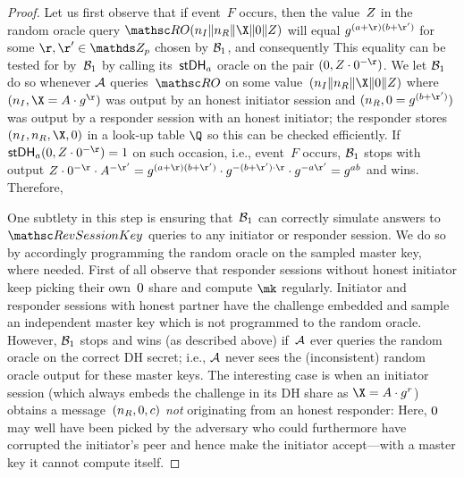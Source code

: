 \begin{proof}
Let us first observe that if event~$F$ occurs, then the value~$Z$ in the random oracle query $\RO(\nonce_I\|\nonce_R\|\X\|\Y\|\Zz)$ will equal $g^{(a+\r)(b+\r')}$ for some  $\r, \r' \in \ZZ_p$ chosen by $\mathcal{B}_1$, and consequently
This equality can be tested for by~$\mathcal{B}_1$ by calling its~$\mathsf{stDH}_a$ oracle on the pair $(\Y, \Zz \cdot \Y^{-\r})$.
We let $\mathcal{B}_1$ do so whenever $\mathcal{A}$ queries~$\RO$ on some value~$(\nonce_I\|\nonce_R\|\X\|\Y\|\Zz)$ where $(\nonce_I, \X = A \cdot g^\r)$ was output by an honest initiator session and $(\nonce_R, \Y = g^{(b+\r')})$ was output by a responder session with an honest initiator; the responder stores $(\nonce_I,\nonce_R,\X,\Y)$ in a look-up table $\Q$ so this can be checked efficiently.
If $\stDH_a(\Y, \Zz \cdot \Y^{-\r}) = 1$ on such occasion, i.e., event~$F$ occurs,
$\mathcal{B}_1$ stops with output $\Zz \cdot \Y^{-\r} \cdot A^{-\r'} = g^{(a+\r)(b+\r')} \cdot g^{-(b + \r') \cdot \r} \cdot g^{-a\r'} = g^{ab}$ and wins.
Therefore,

One subtlety in this step is ensuring that~$\mathcal{B}_1$ can correctly simulate answers to $\RevSessionKey$ queries to any initiator or responder session.
We do so by accordingly programming the random oracle on the sampled master key, where needed.
First of all observe that responder sessions without honest initiator keep picking their own~$\Y$ share and compute $\mk$ regularly.
Initiator and responder sessions with honest partner have the challenge embedded and sample an independent master key which is not programmed to the random oracle.
However, $\mathcal{B}_1$ stops and wins (as described above) if~$\mathcal{A}$ ever queries the random oracle on the correct DH secret;
i.e., $\mathcal{A}$ never sees the (inconsistent) random oracle output for these master keys.
The interesting case is when an initiator session (which always embeds the challenge in its DH share as $\X = A \cdot g^r$) obtains a message~$(\nonce_R, \Y, \ciph)$ \emph{not} originating from an honest responder:
Here, $\Y$ may well have been picked by the adversary who could furthermore have corrupted the initiator's peer and hence make the initiator accept---with a master key it cannot compute itself.


\end{proof}
